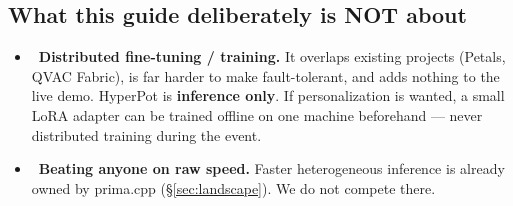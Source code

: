 \subsection{What this guide deliberately is NOT about}
\begin{itemize}[leftmargin=1.4em,nosep]
  \item \Drop\ \textbf{Distributed fine-tuning / training.} It overlaps existing
  projects (Petals, QVAC Fabric), is far harder to make fault-tolerant, and adds
  nothing to the live demo. HyperPot is \textbf{inference only}. If personalization
  is wanted, a small LoRA adapter can be trained offline on one machine
  beforehand --- never distributed training during the event. \HYP
  \item \Drop\ \textbf{Beating anyone on raw speed.} Faster heterogeneous
  inference is already owned by prima.cpp (\S\ref{sec:landscape}). We do not
  compete there.
\end{itemize}
